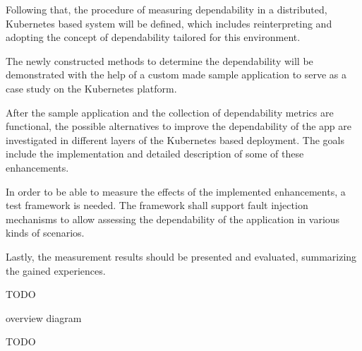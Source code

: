 Following that, the procedure of measuring dependability in a distributed, Kubernetes based system will be defined, which includes reinterpreting and adopting the concept of dependability tailored for this environment.

The newly constructed methods to determine the dependability will be demonstrated with the help of a custom made sample application to serve as a case study on the Kubernetes platform.

After the sample application and the collection of dependability metrics are functional, the possible alternatives to improve the dependability of the app are investigated in different layers of the Kubernetes based deployment. The goals include the implementation and detailed description of some of these enhancements.

In order to be able to measure the effects of the implemented enhancements, a test framework is needed. The framework shall support fault injection mechanisms to allow assessing the dependability of the application in various kinds of scenarios.

Lastly, the measurement results should be presented and evaluated, summarizing the gained experiences.



TODO

overview diagram

TODO

